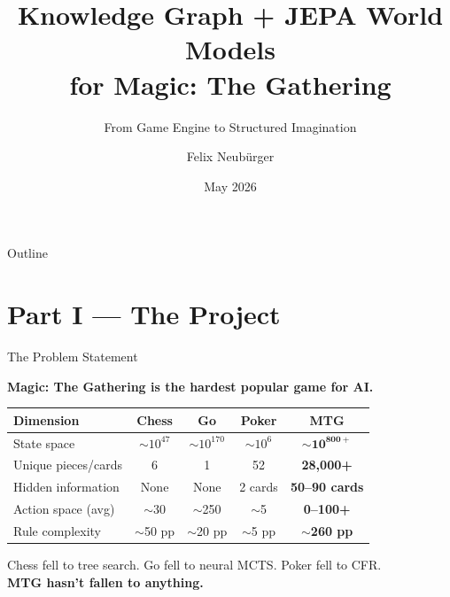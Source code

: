 \documentclass[aspectratio=169, 11pt]{beamer}
\title[KG + JEPA World Models for MTG]{%
  Knowledge Graph + JEPA World Models\\
  for Magic: The Gathering}
\subtitle{From Game Engine to Structured Imagination}
\author{Felix Neub\"urger}
\date{May 2026}
\begin{document}
\begin{frame}
  \titlepage
\end{frame}

\begin{frame}{Outline}
  \tableofcontents
\end{frame}


\section{Part I --- The Project}

\begin{frame}{The Problem Statement}
  \begin{center}
    \large\bfseries Magic: The Gathering is the hardest popular game for AI.
  \end{center}
  \vspace{0.4cm}
  \begin{center}
  \begin{tabular}{@{}lcccc@{}}
    \toprule
    \textbf{Dimension} & \textbf{Chess} & \textbf{Go} & \textbf{Poker} & \textbf{MTG} \\
    \midrule
    State space         & $\sim10^{47}$  & $\sim10^{170}$ & $\sim10^{6}$   & $\mathbf{\sim10^{800+}}$ \\
    Unique pieces/cards & 6              & 1               & 52             & \textbf{28,000+} \\
    Hidden information  & None           & None            & 2 cards        & \textbf{50--90 cards} \\
    Action space (avg)  & $\sim$30       & $\sim$250       & $\sim$5        & \textbf{0--100+} \\
    Rule complexity     & $\sim$50 pp    & $\sim$20 pp     & $\sim$5 pp     & \textbf{$\sim$260 pp} \\
    \bottomrule
  \end{tabular}
  \end{center}
  \vspace{0.3cm}
  \begin{center}
    Chess fell to tree search. Go fell to neural MCTS. Poker fell to CFR.\\
    \textbf{MTG hasn't fallen to anything.}
  \end{center}
\end{frame}
\end{document}
